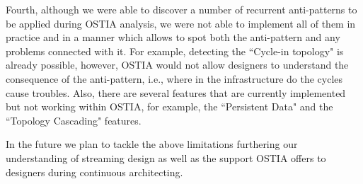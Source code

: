 Fourth, although we were able to discover a number of recurrent anti-patterns to be applied during OSTIA analysis, we were not able to implement all of them in practice and in a manner which allows to spot both the anti-pattern and any problems connected with it. For example, detecting the ``Cycle-in topology" is already possible, however, OSTIA would not allow designers to understand the consequence of the anti-pattern, i.e., where in the infrastructure do the cycles cause troubles. Also, there are several features that are currently implemented but not working within OSTIA, for example, the ``Persistent Data" and the ``Topology Cascading" features.

In the future we plan to tackle the above limitations furthering our understanding of streaming design as well as the support OSTIA offers to designers during continuous architecting.

